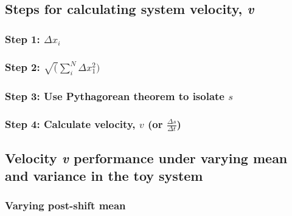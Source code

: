 \documentclass[12pt,twoside,openany]{reedthesis}
\begin{document}
\subsection{\texorpdfstring{Steps for calculating system velocity,
\emph{v}}{Steps for calculating system velocity, v}}\label{steps-for-calculating-system-velocity-v}

\subsubsection{\texorpdfstring{Step 1:
\(\Delta x_i\)}{Step 1: \textbackslash{}Delta x\_i}}\label{step-1-delta-x_i}

\subsubsection{\texorpdfstring{Step 2:
\(\sqrt(\sum_i^N\Delta x_1^2)\)}{Step 2: \textbackslash{}sqrt(\textbackslash{}sum\_i\^{}N\textbackslash{}Delta x\_1\^{}2)}}\label{step-2-sqrtsum_indelta-x_12}

\subsubsection{\texorpdfstring{Step 3: Use Pythagorean theorem to
isolate
\(s\)}{Step 3: Use Pythagorean theorem to isolate s}}\label{step-3-use-pythagorean-theorem-to-isolate-s}

\subsubsection{\texorpdfstring{Step 4: Calculate velocity, \(v\) (or
\(\frac {\Delta s}{\Delta t}\))}{Step 4: Calculate velocity, v (or \textbackslash{}frac \{\textbackslash{}Delta s\}\{\textbackslash{}Delta t\})}}\label{step-4-calculate-velocity-v-or-frac-delta-sdelta-t}

\subsection{\texorpdfstring{Velocity \emph{v} performance under varying
mean and variance in the toy
system}{Velocity v performance under varying mean and variance in the toy system}}\label{velocity-v-performance-under-varying-mean-and-variance-in-the-toy-system}

\subsubsection{Varying post-shift mean}\label{varying-post-shift-mean}
\end{document}
